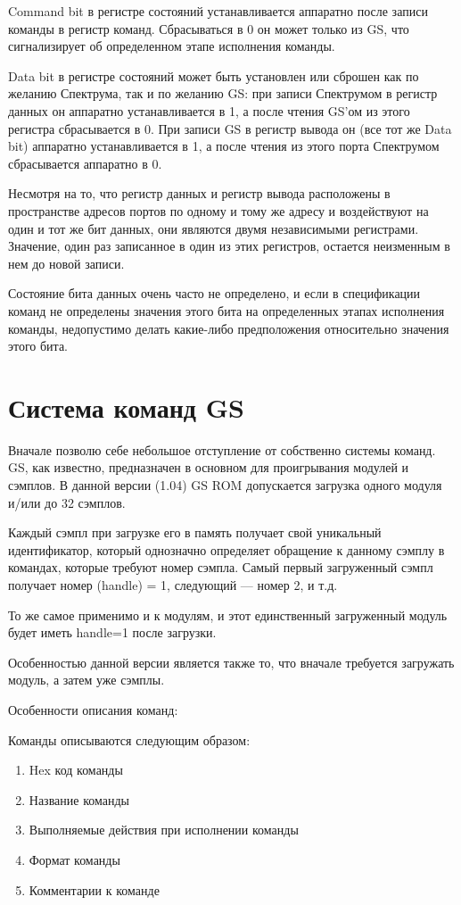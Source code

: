 \documentclass[a4paper,11pt]{article}
\begin{document}
Command bit в регистре состояний устанавливается аппаратно после записи команды в регистр команд. Сбрасываться в 0 он может только из GS, что сигнализирует об определенном этапе исполнения команды.

Data bit в регистре состояний может быть установлен или сброшен как по желанию Спектрума, так и по желанию GS: при записи Спектрумом в регистр данных он аппаратно устанавливается в 1, а после чтения GS'ом из этого регистра сбрасывается в 0. При записи GS в регистр вывода он (все тот же Data bit) аппаратно устанавливается в 1, а после чтения из этого порта Спектрумом сбрасывается аппаратно в 0.

Несмотря на то, что регистр данных и регистр вывода расположены в пространстве адресов портов по одному и тому же адресу и воздействуют на один и тот же бит данных,  они являются двумя независимыми регистрами. Значение, один раз записанное в один из этих регистров, остается неизменным в нем до новой записи.

Состояние бита данных очень часто не определено, и если в спецификации команд не определены значения этого бита на определенных этапах исполнения команды, недопустимо делать какие-либо предположения относительно значения этого бита.

\section{Система команд GS}
Вначале позволю себе небольшое отступление от собственно системы  команд. GS,  как известно,  предназначен в основном для проигрывания модулей и сэмплов. В данной версии (1.04) GS ROM допускается загрузка одного модуля и/или до 32 сэмплов.

Каждый сэмпл при загрузке его в память получает свой уникальный идентификатор, который однозначно определяет обращение к данному сэмплу в командах, которые требуют номер сэмпла. Самый первый загруженный сэмпл получает номер (handle) = 1, следующий --- номер 2, и т.д.

То же самое применимо и к модулям, и этот единственный загруженный модуль будет иметь handle=1 после загрузки.

Особенностью данной версии является также то, что вначале требуется загружать модуль, а затем уже сэмплы.

Особенности описания команд:

\begin{minipage}{\textwidth}
Команды описываются следующим образом:
\begin{enumerate}
\item Hex код команды
\item Название команды
\item Выполняемые действия при исполнении команды
\item Формат команды
\item Комментарии к команде
\end{enumerate}
\end{minipage}
\end{document}
